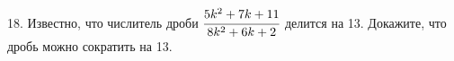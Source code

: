 18. Известно, что числитель дроби $\cfrac{5k^2+7k+11}{8k^2+6k+2}$ делится на 13. Докажите, что дробь можно сократить на 13.\\
